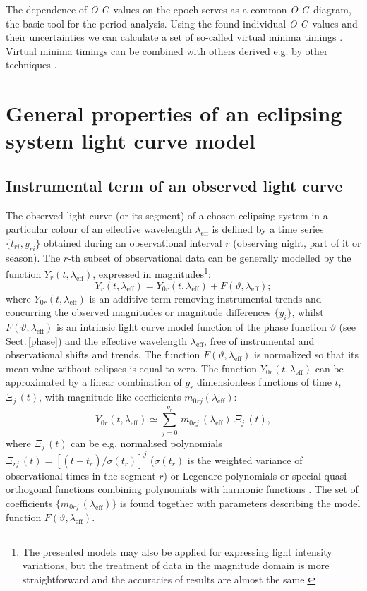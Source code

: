 \documentclass{aa}
\newcommand{\oc}{\textit{O-C}}
\newcommand{\lef}{\lambda_{\mathrm{eff}}}
\begin{document}
The dependence of \oc\ values on the epoch serves as a common \oc\ diagram, the basic tool for the period analysis. Using the found individual \oc\ values and their uncertainties we can calculate a set of so-called virtual minima timings \citep[][or Sect. \ref{xyuniefem} in this paper]{miklijiang,mikcu}. Virtual minima timings can be combined with others derived e.g. by other techniques \citep[e.g.][]{brat,mandel,kwee,mikext,mikKW,zasche14,zasche15}.


\section{General properties of an eclipsing system light curve model}\label{zero}

\subsection{Instrumental term of an observed light curve}\label{instrum}

The observed light curve (or its segment) of a chosen eclipsing system in a particular colour of an effective wavelength $\lef$ is defined by a time series $\{t_{ri},y_{ri}\}$ obtained during an observational interval $r$ (observing night, part of it or season). The $r$-th subset of observational data can be generally modelled by the function $Y_r(t,\lef)$, expressed in magnitudes\footnote{The presented models may also be applied for expressing light intensity variations, but the treatment of data in the magnitude domain is more straightforward and the accuracies of results are almost the same.}:
\begin{equation}
Y_r(t,\lef)=Y_{0r}(t,\lef)+F(\vartheta,\lef); \label{general}
\end{equation}
where $Y_{0r}(t,\lef)$ is an additive term removing instrumental trends and concurring the observed magnitudes or magnitude differences $\{y_i\}$, whilst
$F(\vartheta,\lef)$ is an intrinsic light curve model function of the phase function $\vartheta$ (see Sect.\,\ref{phase}) and the effective wavelength $\lef$, free of instrumental and observational shifts and trends. The function $F(\vartheta,\lef)$ is normalized so that its mean value without eclipses is equal to zero. The function $Y_{0r}(t,\lef)$ can be approximated by a linear combination of $g_r$ dimensionless functions of time $t$, $\mathit{\Xi}_j\,(t)$, with magnitude-like coefficients $m_{0rj}(\lef)$:
\begin{equation}
Y_{0r}(t,\lef)\simeq \sum_{j=0}^{g_r} \,m_{0rj}\,(\lef)\ \mathit{\Xi}_{j}\,(t),\label{instrument}
\end{equation}
where $\mathit{\Xi}_j\,(t)$ can be e.g. normalised polynomials $\mathit{\Xi}_{rj}\,(t)=[(t-\bar{t_r})/\sigma(t_r)]^j$ ($\sigma(t_r)$ is the weighted variance of observational times in the segment $r$) or Legendre polynomials or special quasi orthogonal functions combining polynomials with harmonic functions \citep[see in][]{mikgr}. The set of coefficients $\{m_{0rj}\,(\lef)\}$ is found together with parameters describing the model function $F(\vartheta,\lef)$.
\end{document}
